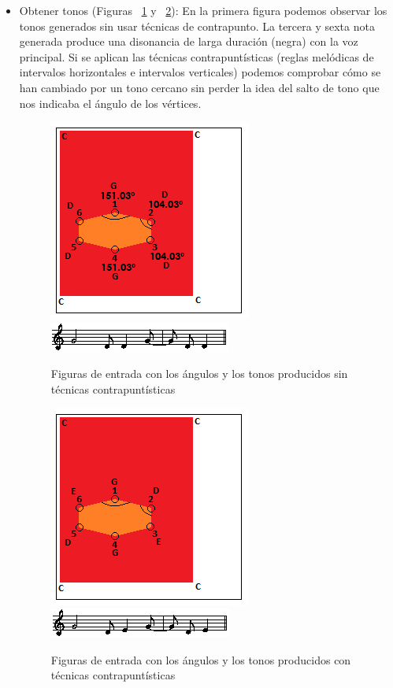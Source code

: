 \begin{itemize}
	\item Obtener tonos (Figuras ~\ref{fig:Figura3Voz2} y ~\ref{fig:Figura4Voz2}): En la primera figura podemos observar los tonos generados sin usar técnicas de contrapunto. La tercera y sexta nota generada produce una disonancia de larga duración (negra) con la voz principal. \color{blue} Si se aplican las técnicas contrapuntísticas (reglas melódicas de intervalos horizontales e intervalos verticales\cite{Contrapunto}) podemos comprobar cómo se han cambiado por un tono cercano sin perder la idea del salto de tono que nos indicaba el ángulo de los vértices. \color{black}

		\begin{figure}[!htbp]
		\centering
		\hspace*{0.0in}
		\includegraphics[scale=1]{graphics/simpletest4-F3.png}
		\includegraphics[scale=1]{graphics/simpletest4-F3-MEL2partitura.png}
		\caption{Figuras de entrada con los ángulos y los tonos producidos sin técnicas contrapuntísticas}
		\label{fig:Figura3Voz2}
		\end{figure}

		\begin{figure}[!htbp]
		\centering
		\hspace*{0.0in}
		\includegraphics[scale=1]{graphics/simpletest4-F3_2.png}
		\includegraphics[scale=1]{graphics/simpletest4-F3_2-MEL2partitura.png}
		\caption{Figuras de entrada con los ángulos y los tonos producidos con técnicas contrapuntísticas}
		\label{fig:Figura4Voz2}
		\end{figure}


\end{itemize}
